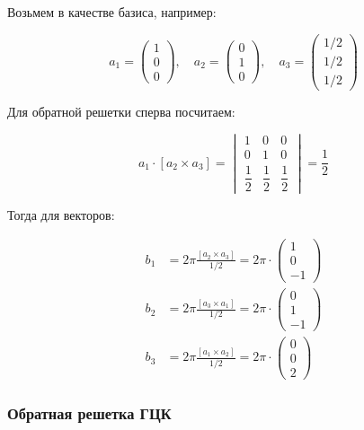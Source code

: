 \documentclass[a4paper, 12pt]{article}
\begin{document}
Возьмем в качестве базиса, например:

\begin{equation}
	a_1 = 
	\begin{pmatrix}
	1 \\ 0 \\ 0
	\end{pmatrix}, \quad
	a_2 = 
	\begin{pmatrix}
		0 \\ 1 \\ 0
	\end{pmatrix}, \quad
	a_3 = 
	\begin{pmatrix}
		1/2 \\ 1/2 \\ 1/2
	\end{pmatrix}	
\end{equation}

Для обратной решетки сперва посчитаем:

\begin{equation}
	a_1 \cdot [a_2 \times a_3] = 
	\begin{vmatrix}
		1 & 0 & 0 \\
		0 & 1 & 0 \\
		\dfrac{1}{2} & \dfrac{1}{2} & \dfrac{1}{2} 
	\end{vmatrix} = \frac{1}{2}
\end{equation}

Тогда для векторов:

\begin{align}
	b_1 &= 2\pi \frac{[a_2 \times a_3]}{1/2} = 2\pi \cdot
	\begin{pmatrix}
		1 \\ 0 \\ -1
	\end{pmatrix}\\
	b_2 &= 2\pi \frac{[a_3 \times a_1]}{1/2} = 2\pi \cdot
	\begin{pmatrix}
		0 \\ 1 \\ -1
	\end{pmatrix}\\
	b_3 &= 2\pi \frac{[a_1 \times a_2]}{1/2} = 2\pi \cdot
	\begin{pmatrix}
		0 \\ 0 \\ 2
	\end{pmatrix}
\end{align}

\subsubsection{Обратная решетка ГЦК}
\end{document}
